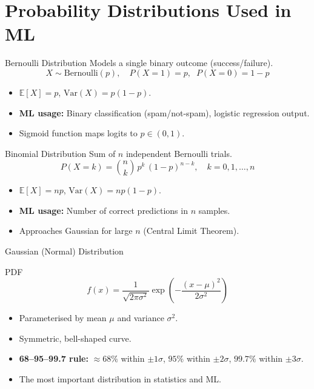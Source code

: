 \section{Probability Distributions Used in ML}

\begin{frame}{Bernoulli Distribution}
Models a single binary outcome (success/failure).
\[
X \sim \mathrm{Bernoulli}(p), \quad P(X=1)=p, \;\; P(X=0)=1-p
\]
\begin{itemize}
    \item $\mathbb{E}[X] = p$, \quad $\mathrm{Var}(X) = p(1-p)$.
    \item \textbf{ML usage:} Binary classification (spam/not-spam), logistic regression output.
    \item Sigmoid function maps logits to $p \in (0,1)$.
\end{itemize}
\end{frame}

\begin{frame}{Binomial Distribution}
Sum of $n$ independent Bernoulli trials.
\[
P(X=k) = \binom{n}{k}\, p^k\, (1-p)^{n-k}, \quad k = 0,1,\dots,n
\]
\begin{itemize}
    \item $\mathbb{E}[X] = np$, \quad $\mathrm{Var}(X) = np(1-p)$.
    \item \textbf{ML usage:} Number of correct predictions in $n$ samples.
    \item Approaches Gaussian for large $n$ (Central Limit Theorem).
\end{itemize}
\end{frame}

\begin{frame}{Gaussian (Normal) Distribution}
\begin{block}{PDF}
\[
f(x) = \frac{1}{\sqrt{2\pi\sigma^2}} \exp\!\left(-\frac{(x-\mu)^2}{2\sigma^2}\right)
\]
\end{block}
\begin{itemize}
    \item Parameterised by mean $\mu$ and variance $\sigma^2$.
    \item Symmetric, bell-shaped curve.
    \item \textbf{68--95--99.7 rule:} ${\approx}68\%$ within $\pm 1\sigma$, $95\%$ within $\pm 2\sigma$, $99.7\%$ within $\pm 3\sigma$.
    \item The most important distribution in statistics and ML.
\end{itemize}
\end{frame}

